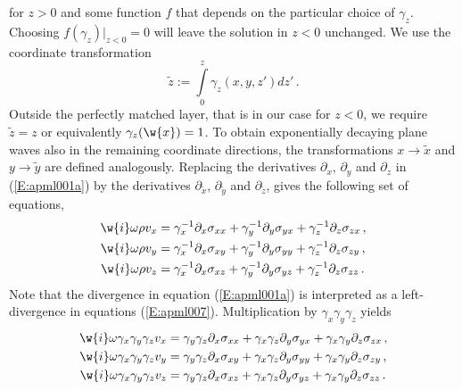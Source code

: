 for $z>0$ and some function $f$ that depends on the particular
choice of $\gamma_z$. Choosing $f(\gamma_z)|_{z<0}=0$ will leave the
solution in $z<0$ unchanged. We use the coordinate transformation
\begin{equation}\label{E:apml006}
\tilde{z}:=\int\limits_{0}^{z} \gamma_z(x, y, z') dz'\,.
\end{equation}
Outside the perfectly matched layer, that is in our case for $z<0$,
we require $\tilde{z}=z$ or equivalently $\gamma_z(\w{x})=1$. To
obtain exponentially decaying plane waves also in the remaining
coordinate directions, the transformations $x\to\tilde{x}$ and
$y\to\tilde{y}$ are defined analogously. Replacing the derivatives
$\partial_x$, $\partial_y$ and $\partial_z$ in (\ref{E:apml001a}) by
the derivatives $\partial_{\tilde{x}}$, $\partial_{\tilde{y}}$ and
$\partial_{\tilde{z}}$, gives the following set of equations,
\begin{subequations}\label{E:apml007}
\begin{align}
\w{i}\omega\rho v_x &= \gamma_x^{-1} \partial_x \sigma_{xx} +
\gamma_y^{-1} \partial_y \sigma_{yx} + \gamma_z^{-1} \partial_z
\sigma_{zx}\,,\label{E:apml007a}\\
\w{i}\omega\rho v_y &= \gamma_x^{-1} \partial_x \sigma_{xy} +
\gamma_y^{-1} \partial_y \sigma_{yy} + \gamma_z^{-1} \partial_z
\sigma_{zy}\,,\label{E:apml007b}\\
\w{i}\omega\rho v_z &= \gamma_x^{-1} \partial_x \sigma_{xz} +
\gamma_y^{-1} \partial_y \sigma_{yz} + \gamma_z^{-1} \partial_z
\sigma_{zz}\,.\label{E:apml007c}
\end{align}
\end{subequations}
Note that the divergence in equation (\ref{E:apml001a}) is
interpreted as a left-divergence in equations (\ref{E:apml007}).
Multiplication by $\gamma_x \gamma_y \gamma_z$ yields
\begin{subequations}\label{E:apml008}
\begin{align}
\w{i}\omega \gamma_x \gamma_y \gamma_z v_x &= \gamma_y \gamma_z
\partial_x \sigma_{xx} + \gamma_x \gamma_z \partial_y \sigma_{yx} +
\gamma_x \gamma_y \partial_z \sigma_{zx}\,,\label{E:apml008a}\\
\w{i}\omega \gamma_x \gamma_y \gamma_z v_y &= \gamma_y \gamma_z
\partial_x \sigma_{xy} + \gamma_x \gamma_z \partial_y \sigma_{yy} +
\gamma_x \gamma_y \partial_z \sigma_{zy}\,,\label{E:apml008b}\\
\w{i}\omega \gamma_x \gamma_y \gamma_z v_z &= \gamma_y \gamma_z
\partial_x \sigma_{xz} + \gamma_x \gamma_z \partial_y \sigma_{yz} +
\gamma_x \gamma_y \partial_z \sigma_{zz}\,.\label{E:apml008c}
\end{align}
\end{subequations}
